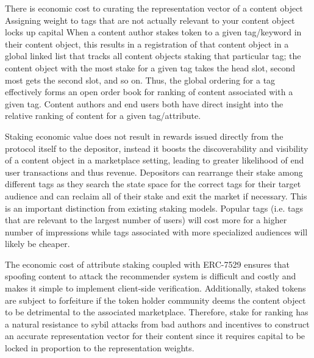 There is economic cost to curating the representation vector of a content object
Assigning weight to tags that are not actually relevant to your content object locks up capital 
When a content author stakes token to a given tag/keyword in their content object, this results in a registration of that content object in a global linked list that tracks all content objects staking that particular tag; the content object with the most stake for a given tag takes the head slot, second most gets the second slot, and so on. 
Thus, the global ordering for a tag effectively forms an open order book for ranking of content associated with a given tag. Content authors and end users both have direct insight into the relative ranking of content for a given tag/attribute. 

Staking economic value does not result in rewards issued directly from the protocol itself to the depositor, instead it boosts the discoverability and visibility of a content object in a marketplace setting, leading to greater likelihood of end user transactions and thus revenue. Depositors can rearrange their stake among different tags as they search the state space for the correct tags for their target audience and can reclaim all of their stake and exit the market if necessary. This is an important distinction from existing staking models. 
Popular tags (i.e. tags that are relevant to the largest number of users) will cost more for a higher number of impressions while tags associated with more specialized audiences will likely be cheaper.

The economic cost of attribute staking coupled with ERC-7529 ensures that spoofing content to attack the recommender system is difficult and costly and makes it simple to implement client-side verification. Additionally, staked tokens are subject to forfeiture if the token holder community deems the content object to be detrimental to the associated marketplace. Therefore, stake for ranking has a natural resistance to sybil attacks from bad authors and incentives to construct an accurate representation vector for their content since it requires capital to be locked in proportion to the representation weights. 